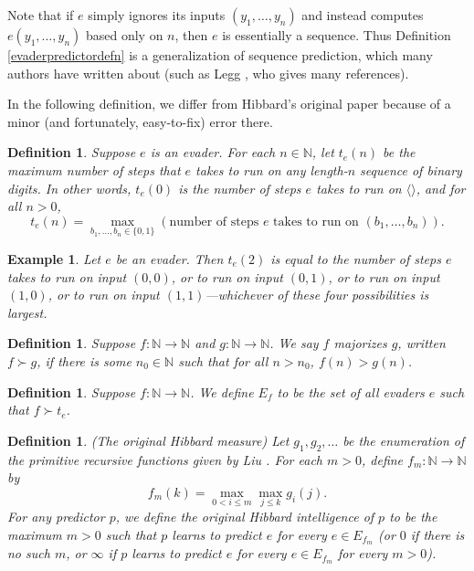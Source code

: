 \documentclass{article}
\newtheorem{definition}[theorem]{Definition}
\newtheorem{example}[theorem]{Example}
\begin{document}
Note that if $e$ simply ignores its inputs $(y_1,\ldots,y_n)$ and instead
computes $e(y_1,\ldots,y_n)$ based only on $n$, then $e$ is essentially a sequence.
Thus Definition \ref{evaderpredictordefn} is a generalization of sequence prediction,
which many authors have written about (such as Legg \cite{legg2006there}, who gives many
references).

In the following definition, we differ from Hibbard's original paper
because of a minor (and fortunately, easy-to-fix) error there.

\begin{definition}
\label{tsubedefinition}
    Suppose $e$ is an evader.
    For each $n\in\mathbb N$, let $t_e(n)$ be the maximum number of steps that $e$ takes
    to run on any length-$n$ sequence of binary digits.
    In other words, $t_e(0)$ is the number of steps $e$ takes to run on $\langle\rangle$,
    and for all $n>0$,
    \[
        t_e(n) = \max_{b_1,\ldots,b_n\in \{0,1\}}
        (\text{number of steps $e$ takes to run on $(b_1,\ldots,b_n)$}).
    \]
\end{definition}

\begin{example}
    Let $e$ be an evader. Then
    $t_e(2)$ is equal to the number of steps $e$ takes to run on input
    $(0,0)$, or to run on input $(0,1)$, or to run on input $(1,0)$, or to run on input
    $(1,1)$---whichever of these four possibilities is largest.
\end{example}

\begin{definition}
\label{functionsuccdefn}
    Suppose $f:\mathbb N\to\mathbb N$ and $g:\mathbb N\to\mathbb N$.
    We say $f$ \emph{majorizes} $g$, written
    $f\succ g$, if there is some $n_0\in \mathbb N$ such that for all
    $n>n_0$, $f(n)>g(n)$.
\end{definition}

\begin{definition}
\label{evadersetdefinition}
    Suppose $f:\mathbb N\to\mathbb N$. We define
    $E_f$ to be the set of all evaders $e$ such that
    $f\succ t_e$.
\end{definition}

\begin{definition}
\label{classichibbardmeasuredefn}
    (The original Hibbard measure)
    Let $g_1,g_2,\ldots$ be the enumeration of the primitive recursive
    functions given by Liu \cite{liu1960enumeration}.
    For each $m>0$, define $f_m:\mathbb N\to\mathbb N$ by
    \[f_m(k)=\max_{0<i\leq m}\max_{j\leq k}g_i(j).\]
    For any predictor $p$, we define the \emph{original Hibbard intelligence of $p$}
    to be the maximum $m>0$
    such that $p$ learns to predict $e$ for every $e\in E_{f_m}$
    (or $0$ if there is no such $m$, or $\infty$ if $p$ learns to predict $e$
    for every $e\in E_{f_m}$ for every $m>0$).
\end{definition}
\end{document}
